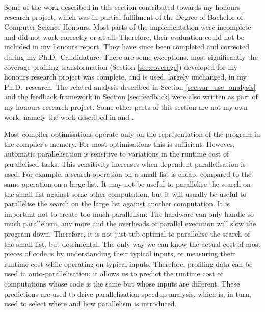 

Some of the work described in this section contributed towards my honours research project,
which was in partial fulfilment of the Degree of Bachelor of Computer Science
Honours.
Most parts of the implementation were incomplete and did not work correctly or
at all.
Therefore,
their evaluation could not be included in my honours report.
They have since been completed and corrected during my Ph.D.\ Candidature.
There are some exceptions,
most significantly the coverage profiling transformation (Section \ref{sec:coverage})
developed for my honours research project was complete, and is used, largely
unchanged, in my Ph.D.\ research.
The related analysis described in Section \ref{sec:var_use_analysis}
and the feedback framework in Section \ref{sec:feedback}
were also written as part of my honours research project.
Some other parts of this section are not my own work,
namely the work described in
\citet{conway:2001:mercury-deep} and
\citet{tannier:2007:parallel_mercury}.

Most compiler optimisations operate only on the representation of the program
in the compiler's memory.
For most optimisations this is sufficient.
However,
automatic parallelisation is sensitive to variations in the runtime cost of
parallelised tasks.
This sensitivity increases when dependent parallelisation is used.
For example,
a search operation on a small list is cheap, compared to the same operation on
a large list.
It may not be useful to parallelise the search on the small list against some
other computation,
but it will usually be useful to parallelise the search on the large list
against another computation.
It is important not to create too much parallelism:
The hardware can only handle so much parallelism,
any more and the overheads of parallel execution will slow the program down.
Therefore, it is not just sub-optimal to parallelise the search of the small list,
but detrimental.
The only way we can know the actual cost of most pieces of code
is by understanding their typical inputs,
or measuring their runtime cost while operating on typical inputs.
Therefore,
profiling data can be used in auto-parallelisation;
it allows us to predict the runtime cost of computations whose
code is the same but whose inputs are different.
These predictions are used to drive parallelisation speedup analysis,
which is, in turn, used to select where and how parallelism is introduced.

